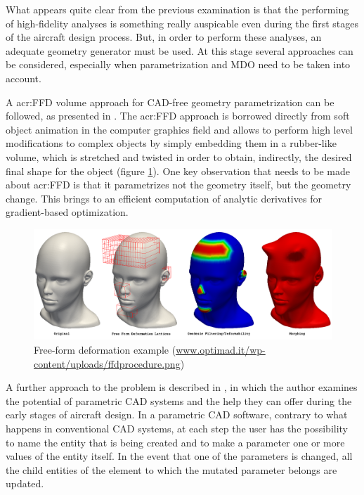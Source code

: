 \bigskip
\noindent
What appears quite clear from the previous examination is that the performing of high-fidelity analyses is something really auspicable even during the first stages of the aircraft design process. But, in order to perform these analyses, an adequate geometry generator must be used. At this stage several approaches can be considered, especially when parametrization and \gls{MDO} need to be taken into account. 

\bigskip
\noindent
A \gls{acr:FFD} volume approach for \gls{CAD}-free geometry parametrization can be followed, as presented in \cite{AIAApaperKenwayKennedy}. The \gls{acr:FFD} approach is borrowed directly from soft object animation in the computer graphics field and allows to perform high level modifications to complex objects by simply embedding them in a rubber-like volume, which is stretched and twisted in order to obtain, indirectly, the desired final shape for the object (figure \ref{fig:FFD}). One key observation that needs to be made about \gls{acr:FFD} is that it parametrizes not the geometry itself, but the geometry change. This brings to an efficient computation of analytic derivatives for gradient-based optimization.
%
\begin{figure}[H]
\centering
\includegraphics[scale=1.05]{Immagini/Capitolo2/ffdprocedure}
\caption{Free-form deformation example (\href{www.optimad.it/wp-content/uploads/ffdprocedure.png}{www.optimad.it/wp-content/uploads/ffdprocedure.png})}
\label{fig:FFD}
\end{figure}
%

\bigskip
\noindent
A further approach to the problem is described in \cite{paperCADinAero}, in which the author examines the potential of parametric \gls{CAD} systems and the help they can offer during the early stages of aircraft design. In a parametric CAD software, contrary to what happens in conventional \gls{CAD} systems, at each step the user has the possibility to name the entity that is being created and to make a parameter one or more values of the entity itself. In the event that one of the parameters is changed, all the child entities of the element to which the mutated parameter belongs are updated.

